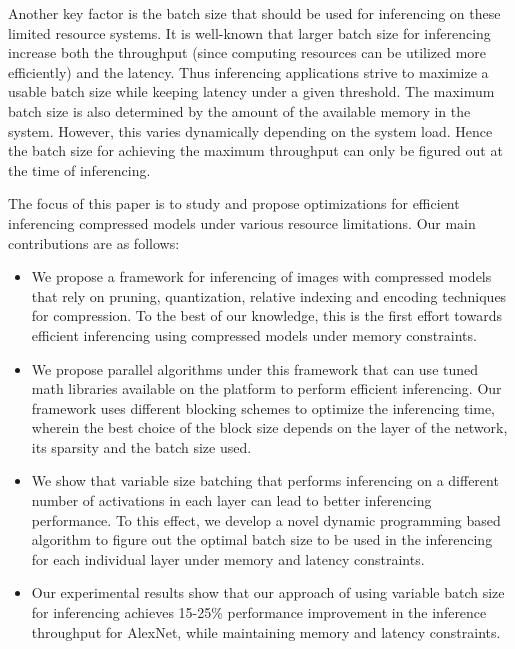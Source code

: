Another key factor is the batch size that should be used for inferencing on these limited resource systems.
It is well-known that larger batch size for inferencing increase both the throughput (since computing resources can be utilized more efficiently) and the latency. Thus inferencing applications strive to 
maximize a usable batch size while keeping latency under a given threshold.
The  maximum batch size is also determined by the amount of the available memory in the system. However, this varies dynamically depending on the system load.
Hence the  batch size for achieving the maximum throughput can only be figured out at the time of inferencing.

The focus of this paper is to study and propose optimizations for efficient inferencing compressed models under various resource limitations. 
Our main contributions are as follows:
\begin{itemize}
\item We propose a framework for inferencing of images with compressed models that rely on pruning, quantization, relative indexing and encoding techniques for compression. To the best of our knowledge, this is the first effort towards efficient inferencing using compressed models under memory constraints.
\item We propose parallel algorithms under this framework that can use tuned math libraries available on the platform to perform  efficient inferencing. Our framework uses different blocking schemes to optimize the inferencing time, wherein the best choice of the block size
depends on the layer of the network, its sparsity and the batch size used. 
\item We show that variable size batching that performs inferencing on
a different number of activations in each layer can lead to better inferencing performance. To this effect, we develop a novel dynamic programming based algorithm to figure out the optimal batch size to be used in the inferencing for each individual layer under memory and latency constraints.
\item Our experimental results show that our approach of using variable batch size for inferencing 
achieves 15-25\%   performance improvement  in the inference throughput for AlexNet, while maintaining  memory and latency constraints.
\end{itemize}

